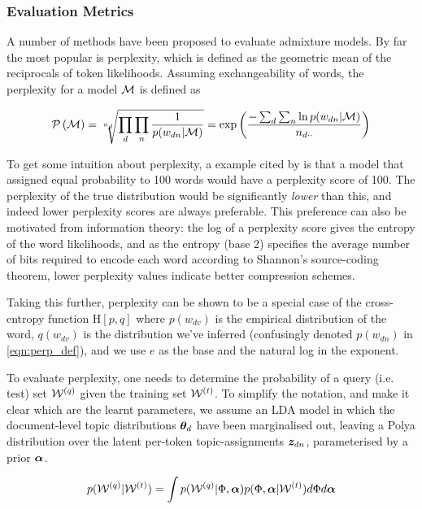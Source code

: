 


\subsubsection{Evaluation Metrics}
\label{sec:eval}

A number of methods have been proposed to evaluate admixture models. By far the most popular is perplexity, which is defined as the geometric mean of the reciprocals of token likelihoods. Assuming exchangeability of words, the perplexity for a model $\mathcal{M}$ is defined as

\begin{align}
\mathcal{P} \left( { \mathcal{M} } \right) = \sqrt[n_{d}]{\prod_d \prod_n \frac{1}{p(w_{dn}|\mathcal{M})}} = \exp \left( \frac{-\sum_d \sum_n \ln p(w_{dn}|\mathcal{M})}{n_{d\cdot\cdot}} \right) \label{eqn:perp_def}
\end{align}

To get some intuition about perplexity, a example cited by \cite{Goodman2001} is that a model that assigned equal probability to 100 words would have a perplexity score of 100. The perplexity of the true distribution would be significantly \emph{lower} than this, and indeed lower perplexity scores are always preferable. This preference can also be motivated from information theory: the log of a perplexity score gives the entropy of the word likelihoods, and as the entropy (base 2) specifies the average number of bits required to encode each word according to Shannon's source-coding theorem, lower perplexity values indicate better compression schemes.

Taking this further, perplexity can be shown to be a special case of the cross-entropy function $\text{H}[p,q]$ where $p(w_{dv})$ is the empirical distribution of the word, $q(w_{dv})$ is the distribution we've inferred (confusingly denoted $p(w_{dn})$ in \eqref{eqn:perp_def}), and we use $e$ as the base and the natural log in the exponent. 

To evaluate perplexity, one needs to determine the probability of a query (i.e. test) set $\mathcal{W}^{(q)}$ given the training set $\mathcal{W}^{(t)}$. To simplify the notation, and make it clear which are the learnt parameters, we assume an LDA model in which the document-level topic distributions ${ \bm \theta_d }$ have been marginalised out, leaving a Polya distribution over the latent per-token topic-assignments ${ \bm z_{dn} }$, parameterised by a prior $\bm \alpha$.

\begin{align}
p(\mathcal{W}^{(q)}|\mathcal{W}^{(t)}) = \int p(\mathcal{W}^{(q)}|\Phi, \bm \alpha)p(\Phi,\bm \alpha | \mathcal{W}^{(t)}) d\Phi d\bm \alpha
\end{align}

